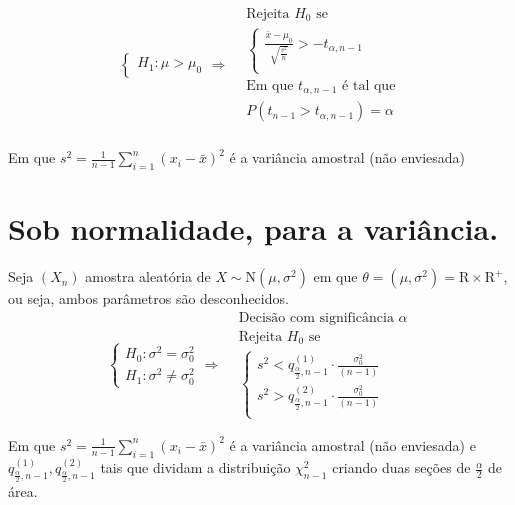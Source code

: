 \documentclass[
  letterpaper,
  DIV=11,
  numbers=noendperiod]{scrreprt}
\begin{document}
\[\begin{aligned}
\begin{cases}
H_{1}: \mu > \mu_{0}
\end{cases} \Rightarrow 
\begin{aligned}
&\text{Rejeita $H_{0}$ se} \\
&\begin{cases}
\frac{\bar{x}-\mu_{0}}{\sqrt{ \frac{s^2}{n} }} > - t_{\alpha,n-1} \\
\end{cases} \\
& \text{Em que $t_{\alpha,n-1}$ é tal que} \\
& P\left( t_{n-1} > t_{\alpha,n-1} \right) = \alpha
\end{aligned} \\
\end{aligned}
\]

Em que \(s^2 = \frac{1}{n-1} \sum^n_{i=1}(x_{i}-\bar{x})^2\) é a
variância amostral (não enviesada)

\section{Sob normalidade, para a
variância.}\label{sob-normalidade-para-a-variuxe2ncia.}

Seja \((X_{n})\) amostra aleatória de
\(X \sim \mathrm{N}(\mu,\sigma^2)\) em que
\(\theta = (\mu, \sigma^2) = \mathrm{R} \times \mathrm{R}^+\), ou seja,
ambos parâmetros são desconhecidos. \[
\begin{cases}
H_{0} : \sigma^2 = \sigma^2_{0} \\
H_{1}: \sigma^2 \neq \sigma^2_{0}
\end{cases} \Rightarrow 
\begin{aligned}
& \text{Decisão com significância } \alpha \\
&\text{Rejeita $H_{0}$ se} \\
&\begin{cases}
s^2 < q_{\frac{\alpha}{2},n-1}^{(1)} \cdot \frac{\sigma^2_{0}}{(n-1)} \\
s^2 > q_{\frac{\alpha}{2},n-1}^{(2)} \cdot \frac{\sigma^2_{0}}{(n-1)}\\
\end{cases}
\end{aligned}
\]

Em que \(s^2 = \frac{1}{n-1} \sum^n_{i=1}(x_{i}-\bar{x})^2\) é a
variância amostral (não enviesada) e
\(q_{\frac{\alpha}{2},n-1}^{(1)}, q_{\frac{\alpha}{2},n-1}^{(2)}\) tais
que dividam a distribuição \(\chi^2_{n-1}\) criando duas seções de
\(\frac{\alpha}{2}\) de área.
\end{document}
